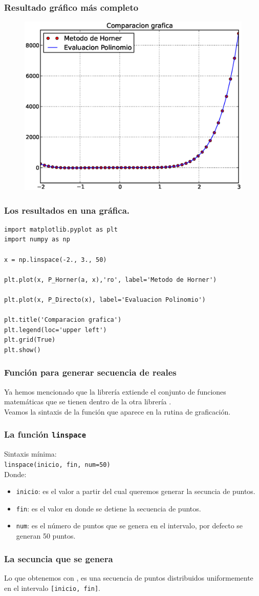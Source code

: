 \documentclass[12pt]{beamer}
\begin{document}
\begin{frame}[fragile]
\frametitle{Resultado gráfico más completo}
\begin{figure}
	\centering
	\includegraphics[scale=0.45]{Imagenes/MetodoHorner.eps} 
\end{figure}
\end{frame}
\begin{frame}
\frametitle{Los resultados en una gráfica.}
\begin{lstlisting}[caption=Elaboración de la gráfica]
import matplotlib.pyplot as plt
import numpy as np

x = np.linspace(-2., 3., 50)

plt.plot(x, P_Horner(a, x),'ro', label='Metodo de Horner')

plt.plot(x, P_Directo(x), label='Evaluacion Polinomio')

plt.title('Comparacion grafica')
plt.legend(loc='upper left')
plt.grid(True)
plt.show()
\end{lstlisting}
\end{frame}
\begin{frame}
\frametitle{Función para generar secuencia de reales}
Ya hemos mencionado que la librería  extiende el conjunto de funciones matemáticas que se tienen dentro de la otra librería .
\\
\bigskip
\pause
Veamos la sintaxis de la función  que aparece en la rutina de graficación.
\end{frame}
\begin{frame}
\frametitle{La función \texttt{linspace}}
Sintaxis mínima:
\\
\medskip
\texttt{linspace(inicio, fin, num=50)}
\\
\medskip
Donde:
\begin{itemize}
\item \texttt{inicio}: es el valor a partir del cual queremos generar la secuncia de puntos.
\item \texttt{fin}: es el valor en donde se detiene la secuencia de puntos.
\item \texttt{num}: es el número de puntos que se genera en el intervalo, por defecto se generan 50 puntos.
\end{itemize}
\end{frame}
\begin{frame}
\frametitle{La secuncia que se genera}
Lo que obtenemos con , es una secuencia de puntos distribuidos uniformemente en el intervalo \texttt{[inicio, fin]}.
\end{frame}
\end{document}
